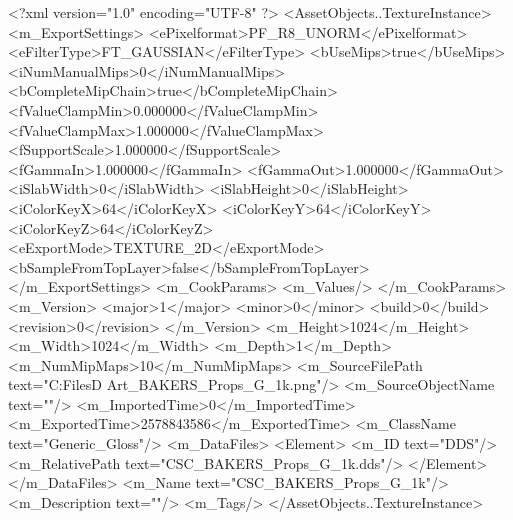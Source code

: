 <?xml version="1.0" encoding="UTF-8" ?>
<AssetObjects..TextureInstance>
	<m_ExportSettings>
		<ePixelformat>PF_R8_UNORM</ePixelformat>
		<eFilterType>FT_GAUSSIAN</eFilterType>
		<bUseMips>true</bUseMips>
		<iNumManualMips>0</iNumManualMips>
		<bCompleteMipChain>true</bCompleteMipChain>
		<fValueClampMin>0.000000</fValueClampMin>
		<fValueClampMax>1.000000</fValueClampMax>
		<fSupportScale>1.000000</fSupportScale>
		<fGammaIn>1.000000</fGammaIn>
		<fGammaOut>1.000000</fGammaOut>
		<iSlabWidth>0</iSlabWidth>
		<iSlabHeight>0</iSlabHeight>
		<iColorKeyX>64</iColorKeyX>
		<iColorKeyY>64</iColorKeyY>
		<iColorKeyZ>64</iColorKeyZ>
		<eExportMode>TEXTURE_2D</eExportMode>
		<bSampleFromTopLayer>false</bSampleFromTopLayer>
	</m_ExportSettings>
	<m_CookParams>
		<m_Values/>
	</m_CookParams>
	<m_Version>
		<major>1</major>
		<minor>0</minor>
		<build>0</build>
		<revision>0</revision>
	</m_Version>
	<m_Height>1024</m_Height>
	<m_Width>1024</m_Width>
	<m_Depth>1</m_Depth>
	<m_NumMipMaps>10</m_NumMipMaps>
	<m_SourceFilePath text="C:\Users\Shadow\Desktop\Working Files\3D Art\Textures\CSC_BAKERS_Props_G_1k.png"/>
	<m_SourceObjectName text=""/>
	<m_ImportedTime>0</m_ImportedTime>
	<m_ExportedTime>2578843586</m_ExportedTime>
	<m_ClassName text="Generic_Gloss"/>
	<m_DataFiles>
		<Element>
			<m_ID text="DDS"/>
			<m_RelativePath text="CSC_BAKERS_Props_G_1k.dds"/>
		</Element>
	</m_DataFiles>
	<m_Name text="CSC_BAKERS_Props_G_1k"/>
	<m_Description text=""/>
	<m_Tags/>
</AssetObjects..TextureInstance>

